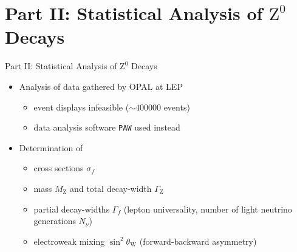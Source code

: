 \documentclass[11pt,xcolor=dvipsnames,professionalfonts]{beamer}
\begin{document}
\section{Part II: Statistical Analysis of $\mathrm{Z}^0$ Decays}
\begin{frame}{Part II: Statistical Analysis of $\mathrm{Z}^0$ Decays}
	\begin{itemize}
		\setlength\itemsep{2.em}
		\item Analysis of data gathered by OPAL at LEP
		\begin{itemize}
			\setlength\itemsep{0.5em}
			\item event displays infeasible ($\sim \num{400000}$ events)
			\item data analysis software \texttt{PAW} used instead
		\end{itemize}
		
		\item Determination of
		\begin{itemize}
			\setlength\itemsep{0.5em}
			\item cross sections $\sigma_f$
			
			\item mass $M_\mathrm{Z}$ and total decay-width $\Gamma_\mathrm{Z}$
			
			\item partial decay-widths $\Gamma_f$ (lepton universality, number of light neutrino generations $N_\nu$)
			
			\item electroweak mixing $\sin^2\theta_\mathrm{W}$ (forward-backward asymmetry)
		\end{itemize}
	\end{itemize}
\end{frame}
\end{document}
